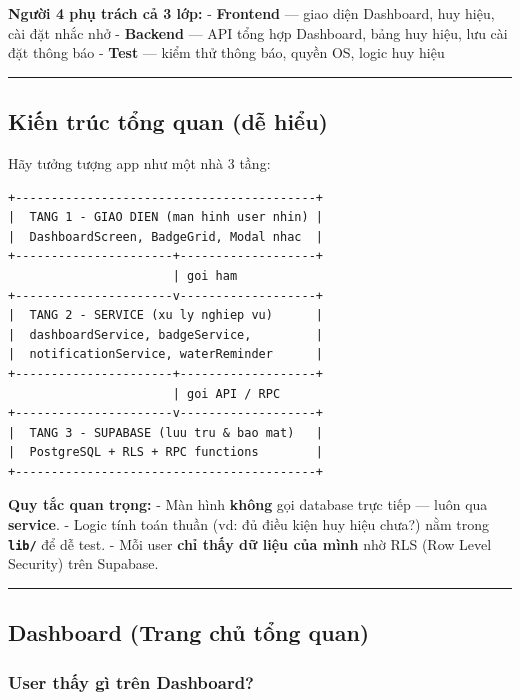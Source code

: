 \documentclass[12pt,a4paper]{article}
\providecommand{\passthrough}[1]{#1}
\begin{document}
\textbf{Người 4 phụ trách cả 3 lớp:} - \textbf{Frontend} --- giao diện
Dashboard, huy hiệu, cài đặt nhắc nhở - \textbf{Backend} --- API tổng
hợp Dashboard, bảng huy hiệu, lưu cài đặt thông báo - \textbf{Test} ---
kiểm thử thông báo, quyền OS, logic huy hiệu

\begin{center}\rule{0.5\linewidth}{0.5pt}\end{center}

\subsection{Kiến trúc tổng quan (dễ
hiểu)}\label{kiux1ebfn-truxfac-tux1ed5ng-quan-dux1ec5-hiux1ec3u}

Hãy tưởng tượng app như một nhà 3 tầng:

\begin{lstlisting}
+------------------------------------------+
|  TANG 1 - GIAO DIEN (man hinh user nhin) |
|  DashboardScreen, BadgeGrid, Modal nhac  |
+----------------------+-------------------+
                       | goi ham
+----------------------v-------------------+
|  TANG 2 - SERVICE (xu ly nghiep vu)      |
|  dashboardService, badgeService,         |
|  notificationService, waterReminder      |
+----------------------+-------------------+
                       | goi API / RPC
+----------------------v-------------------+
|  TANG 3 - SUPABASE (luu tru & bao mat)   |
|  PostgreSQL + RLS + RPC functions        |
+------------------------------------------+
\end{lstlisting}

\textbf{Quy tắc quan trọng:} - Màn hình \textbf{không} gọi database trực
tiếp --- luôn qua \textbf{service}. - Logic tính toán thuần (vd: đủ điều
kiện huy hiệu chưa?) nằm trong \textbf{\passthrough{\lstinline!lib/!}}
để dễ test. - Mỗi user \textbf{chỉ thấy dữ liệu của mình} nhờ RLS (Row
Level Security) trên Supabase.

\begin{center}\rule{0.5\linewidth}{0.5pt}\end{center}

\subsection{Dashboard (Trang chủ tổng
quan)}\label{dashboard-trang-chux1ee7-tux1ed5ng-quan}

\subsubsection{User thấy gì trên
Dashboard?}\label{user-thux1ea5y-guxec-truxean-dashboard}
\end{document}
